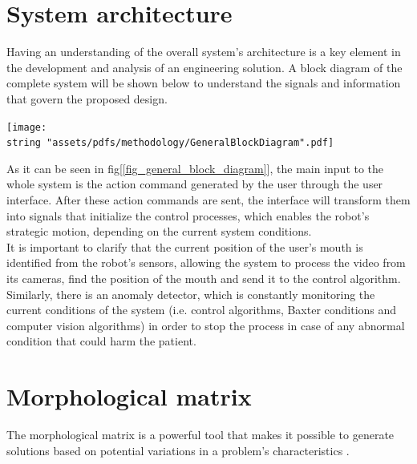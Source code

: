 \documentclass[11pt]{report} %
\begin{document}
\section{System architecture}

Having an understanding of the overall system's architecture is a key element in the development and analysis of an engineering solution. A block diagram of the complete system will be shown below to understand the signals and information that govern the proposed design.


\begin{center}
\texttt{[image: \\string "assets/pdfs/methodology/GeneralBlockDiagram".pdf]}
\bigbreak
\begin{minipage}{\linewidth} %
\label{fig_general_block_diagram}
\end{minipage} \end{center}

As it can be seen in fig[\ref{fig_general_block_diagram}], the main input to the whole system is the action command generated by the user through the user interface. After these action commands are sent, the interface will transform them into signals that initialize the control processes, which enables the robot's strategic motion, depending on the current system conditions.\\

It is important to clarify that the current position of the user's mouth is identified from the robot's sensors, allowing the system to process the video from its cameras, find the position of the mouth and send it to the control algorithm.\\

Similarly, there is an anomaly detector, which is constantly monitoring the current conditions of the system (i.e. control algorithms, Baxter conditions and computer vision algorithms) in order to stop the process in case of any abnormal condition that could harm the patient.\\


\section{Morphological matrix}

The morphological matrix is a powerful tool that makes it possible to generate solutions based on potential variations in a problem's characteristics \citep{cite_morphological_matrix}.\\
\end{document}
